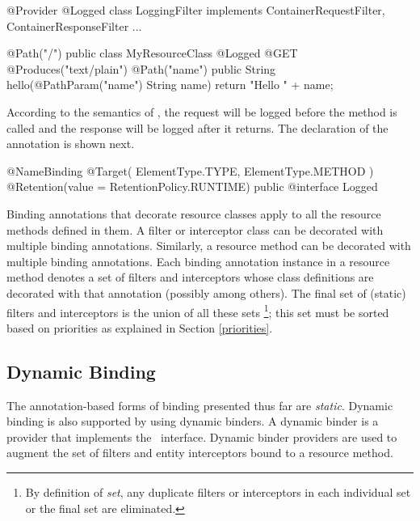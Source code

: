 \begin{listing}{1}
@Provider
@Logged
class LoggingFilter implements ContainerRequestFilter, 
                               ContainerResponseFilter {
    ...
}
\end{listing}

\begin{listing}{1}
@Path("/")
public class MyResourceClass {
    @Logged
    @GET
    @Produces("text/plain")
    @Path("{name}")
    public String hello(@PathParam("name") String name) {
        return "Hello " + name;
    }
}
\end{listing}

According to the semantics of , the request will be logged before the  method is called and the response will be logged after it returns. The declaration of the  annotation is shown next.

\begin{listing}{1}
@NameBinding
@Target({ ElementType.TYPE, ElementType.METHOD })
@Retention(value = RetentionPolicy.RUNTIME)
public @interface Logged { }
\end{listing}

Binding annotations that decorate resource classes apply to all the resource methods defined in them. A filter or interceptor class can be decorated with multiple binding annotations. Similarly, a resource method can be decorated with multiple binding annotations.  Each binding annotation instance in a resource method denotes a set of filters and interceptors whose class definitions are decorated with that annotation (possibly among others). The final set of (static) filters and interceptors is the union of all these sets \footnote{By definition of {\em set}, any duplicate filters or interceptors in each individual set or the final set are eliminated.}; this set must be sorted based on priorities as explained in Section \ref{priorities}. 

\subsection{Dynamic Binding}
\label{dynamic_binding}

The annotation-based forms of binding presented thus far are {\em static}. Dynamic binding is also supported by using dynamic binders. A dynamic binder is a provider that implements the \DynamicBinder\ interface. Dynamic binder providers are used to augment the set of filters and entity interceptors bound to a resource method. 

